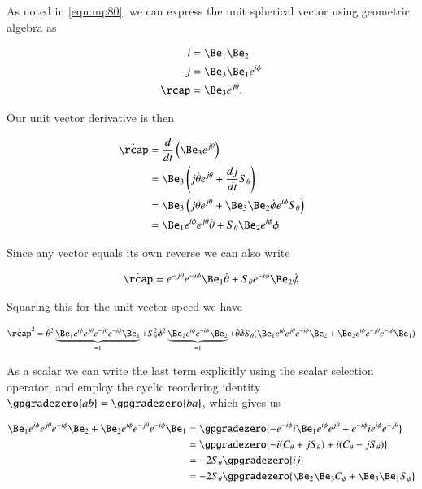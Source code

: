 As noted in \ref{eqn:mp80}, we can express the unit spherical vector using geometric algebra as

\begin{align}\label{eqn:mp280}
i &= \Be_1 \Be_2 \\
j &= \Be_3 \Be_1 e^{i \phi} \\
\rcap &= \Be_3 e^{j \theta}.
\end{align}

Our unit vector derivative is then

\begin{align*}
\dot{\rcap}
&=
\frac{d}{dt} \left( \Be_3 e^{j \theta} \right) \\
&=
\Be_3 \left( j \dot{\theta} e^{j \theta} + \frac{d j }{dt} S_\theta \right)  \\
&=
\Be_3 \left( j \dot{\theta} e^{j \theta} + \Be_3 \Be_2 \dot{\phi} e^{i \phi} S_\theta \right)  \\
&=
\Be_1 e^{i\phi} e^{j \theta} \dot{\theta} + S_\theta \Be_2 e^{i \phi} \dot{\phi}
\end{align*}

Since any vector equals its own reverse we can also write

\begin{align}\label{eqn:mp290}
\dot{\rcap} = e^{-j\theta} e^{-i \phi} \Be_1 \dot{\theta} + S_\theta e^{-i \phi} \Be_2 \dot{\phi}
\end{align}

Squaring this for the unit vector speed we have

\begin{align}\label{eqn:mp300}
\dot{\rcap}^2 = 
\dot{\theta}^2 \underbrace{\Be_1 e^{i\phi} e^{j \theta} e^{-j\theta} e^{-i \phi} \Be_1 }_{=1}
+ S_\theta^2 \dot{\phi}^2 \underbrace{\Be_2 e^{i \phi} e^{-i \phi} \Be_2 }_{=1}
+ 
\dot{\theta} 
\dot{\phi}
S_\theta
(
\Be_1 e^{i\phi} e^{j \theta} 
e^{-i \phi} \Be_2 
+ \Be_2 e^{i \phi} 
e^{-j\theta} e^{-i \phi} \Be_1 )
\end{align}

As a scalar we can write the last term explicitly using the scalar selection operator, and employ the cyclic reordering identity $\gpgradezero{ab} = \gpgradezero{ba}$, which gives us

\begin{align*}
\Be_1 e^{i\phi} e^{j \theta} 
e^{-i \phi} \Be_2 
+ \Be_2 e^{i \phi} 
e^{-j\theta} e^{-i \phi} \Be_1 
&=
\gpgradezero{
- e^{-i \phi} i \Be_1 e^{i\phi} e^{j \theta} 
+ e^{-i \phi} i e^{i \phi} e^{-j\theta} 
} \\
&=
\gpgradezero{
- i (C_\theta + j S_\theta)
+ i (C_\theta - j S_\theta)
} \\
&= 
- 2 S_\theta \gpgradezero{ i j } \\
&= 
- 2 S_\theta \gpgradezero{ \Be_2 \Be_3 C_\phi + \Be_3 \Be_1 S_\phi } \\
\end{align*}

